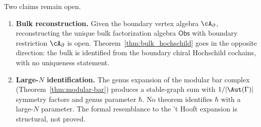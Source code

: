 \begin{remark}
Two claims remain open.
\begin{enumerate}[leftmargin=2.4em]
\item \textbf{Bulk reconstruction.} Given the boundary vertex
 algebra $\cA_\partial$, reconstructing the unique
 bulk factorization algebra $\mathsf{Obs}$ with boundary restriction
 $\cA_\partial$ is open.
 Theorem~\ref{thm:bulk_hochschild} goes in the opposite direction:
 the bulk is identified from the boundary chiral Hochschild cochains, with no uniqueness statement.
\item \textbf{Large-$N$ identification.} The genus expansion
 of the modular bar complex (Theorem~\ref{thm:modular-bar})
 produces a stable-graph sum with $1/|\Aut(\Gamma)|$ symmetry
 factors and genus parameter $\hbar$. No theorem identifies $\hbar$ with a large-$N$ parameter.
 The formal resemblance to the 't Hooft expansion is structural,
 not proved.
\end{enumerate}
\end{remark}


